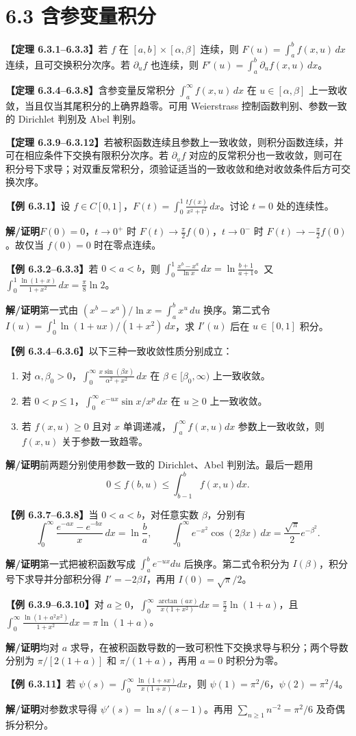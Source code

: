 \documentclass[UTF8,a4paper,11pt]{ctexart}
\newcommand{\ex}[1]{\par\noindent\textbf{【例 #1】}\;}
\newcommand{\thm}[1]{\par\noindent\textbf{【定理 #1】}\;}
\newcommand{\sol}{\par\noindent\textbf{解/证明}\;}
\begin{document}
\section*{6.3 含参变量积分}
\thm{6.3.1--6.3.3}若 $f$ 在 $[a,b]\times[\alpha,\beta]$ 连续，则 $F(u)=\int_a^bf(x,u)\,dx$ 连续，且可交换积分次序。若 $\partial_u f$ 也连续，则 $F'(u)=\int_a^b\partial_u f(x,u)\,dx$。
\thm{6.3.4--6.3.8}含参变量反常积分 $\int_a^\infty f(x,u)\,dx$ 在 $u\in[\alpha,\beta]$ 上一致收敛，当且仅当其尾积分的上确界趋零。可用 Weierstrass 控制函数判别、参数一致的 Dirichlet 判别及 Abel 判别。
\thm{6.3.9--6.3.12}若被积函数连续且参数上一致收敛，则积分函数连续，并可在相应条件下交换有限积分次序。若 $\partial_u f$ 对应的反常积分也一致收敛，则可在积分号下求导；对双重反常积分，须验证适当的一致收敛和绝对收敛条件后方可交换次序。
\ex{6.3.1}设 $f\in C[0,1]$，$F(t)=\int_0^1\frac{tf(x)}{x^2+t^2}\,dx$。讨论 $t=0$ 处的连续性。
\sol $F(0)=0$，$t\to0^+$ 时 $F(t)\to\frac\pi2 f(0)$，$t\to0^-$ 时 $F(t)\to-\frac\pi2 f(0)$。故仅当 $f(0)=0$ 时在零点连续。
\ex{6.3.2--6.3.3}若 $0<a<b$，则 $\displaystyle\int_0^1\frac{x^b-x^a}{\ln x}\,dx=\ln\frac{b+1}{a+1}$。又 $\displaystyle\int_0^1\frac{\ln(1+x)}{1+x^2}\,dx=\frac\pi8\ln2$。
\sol 第一式由 $(x^b-x^a)/\ln x=\int_a^b x^u\,du$ 换序。第二式令 $I(u)=\int_0^1\ln(1+ux)/(1+x^2)\,dx$，求 $I'(u)$ 后在 $u\in[0,1]$ 积分。
\ex{6.3.4--6.3.6}以下三种一致收敛性质分别成立：
\begin{enumerate}[leftmargin=2em]
\item 对 $\alpha,\beta_0>0$，$\int_0^\infty \frac{x\sin(\beta x)}{\alpha^2+x^2}\,dx$ 在 $\beta\in[\beta_0,\infty)$ 上一致收敛。
\item 若 $0<p\le1$，$\int_0^\infty e^{-ux}\sin x/x^p\,dx$ 在 $u\ge0$ 上一致收敛。
\item 若 $f(x,u)\ge0$ 且对 $x$ 单调递减，$\int_a^\infty f(x,u)dx$ 参数上一致收敛，则 $f(x,u)$ 关于参数一致趋零。
\end{enumerate}
\sol 前两题分别使用参数一致的 Dirichlet、Abel 判别法。最后一题用
\[0\le f(b,u)\le\int_{b-1}^b f(x,u)dx.\]
\ex{6.3.7--6.3.8}当 $0<a<b$，对任意实数 $\beta$，分别有
\[\int_0^\infty\frac{e^{-ax}-e^{-bx}}x\,dx=\ln\frac ba,\qquad
\int_0^\infty e^{-x^2}\cos(2\beta x)\,dx=\frac{\sqrt\pi}{2}e^{-\beta^2}.\]
\sol 第一式把被积函数写成 $\int_a^b e^{-ux}du$ 后换序。第二式令积分为 $I(\beta)$，积分号下求导并分部积分得 $I'=-2\beta I$，再用 $I(0)=\sqrt\pi/2$。
\ex{6.3.9--6.3.10}对 $a\ge0$，$\displaystyle\int_0^\infty\frac{\arctan(ax)}{x(1+x^2)}dx=\frac\pi2\ln(1+a)$，且 $\displaystyle\int_0^\infty\frac{\ln(1+a^2x^2)}{1+x^2}dx=\pi\ln(1+a)$。
\sol 均对 $a$ 求导，在被积函数导数的一致可积性下交换求导与积分；两个导数分别为 $\pi/[2(1+a)]$ 和 $\pi/(1+a)$，再用 $a=0$ 时积分为零。
\ex{6.3.11}若 $\psi(s)=\int_0^\infty\frac{\ln(1+sx)}{x(1+x)}dx$，则 $\psi(1)=\pi^2/6$，$\psi(2)=\pi^2/4$。
\sol 对参数求导得 $\psi'(s)=\ln s/(s-1)$。再用 $\sum_{n\ge1}n^{-2}=\pi^2/6$ 及奇偶拆分积分。
\end{document}
